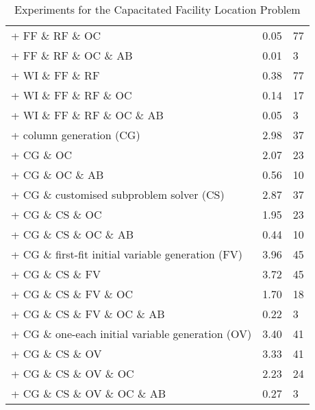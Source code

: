 \begin{table}[ht]
\begin{center}
\begin{tabular}[c]{|lll|}
+ FF \& RF \& OC                                   & 0.05 							& 77 \\
+ FF \& RF \& OC \& AB                             & 0.01 							& 3 \\
\hline
+ WI \& FF \& RF                                   & 0.38 							& 77 \\
+ WI \& FF \& RF \& OC                             & 0.14 							& 17 \\
+ WI \& FF \& RF \& OC \& AB                       & 0.05 							& 3 \\
\hline
+ column generation (CG)                           & 2.98 							& 37 \\
+ CG \& OC                                         & 2.07 							& 23 \\
+ CG \& OC \& AB                                   & 0.56								& 10 \\
\hline
+ CG \& customised subproblem solver (CS)          & 2.87 							& 37 \\
+ CG \& CS \& OC                                   & 1.95 							& 23 \\
+ CG \& CS \& OC \& AB                             & 0.44 							& 10 \\
\hline
+ CG \& first-fit initial variable generation (FV) & 3.96 							& 45 \\
+ CG \& CS \& FV                                   & 3.72 							& 45 \\
+ CG \& CS \& FV \& OC                             & 1.70 							& 18 \\
+ CG \& CS \& FV \& OC \& AB                       & 0.22 							& 3\\
\hline
+ CG \& one-each initial variable generation (OV)  & 3.40 							& 41 \\
+ CG \& CS \& OV                                   & 3.33 							& 41 \\
+ CG \& CS \& OV \& OC                             & 2.23 							& 24 \\
+ CG \& CS \& OV \& OC \& AB                       & 0.27 							& 3 \\
\hline
\end{tabular} 
\end{center}
\caption{Experiments for the Capacitated Facility Location Problem} \label{tab:fac_exp}
\end{table}

